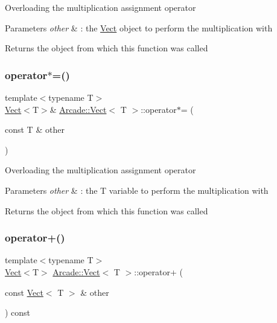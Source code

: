 Overloading the multiplication assignment operator 
\begin{DoxyParams}{Parameters}
{\em other} & \+: the \hyperlink{class_arcade_1_1_vect}{Vect} object to perform the multiplication with \\
\hline
\end{DoxyParams}
\begin{DoxyReturn}{Returns}
the object from which this function was called 
\end{DoxyReturn}
\mbox{\label{class_arcade_1_1_vect_a64363c0a5ff75713a11174f48de1a8ea}} 
\subsubsection{\texorpdfstring{operator$\ast$=()}{operator*=()}\hspace{0.1cm}{\footnotesize\ttfamily [2/2]}}
{\footnotesize\ttfamily template$<$typename T$>$ \\
\hyperlink{class_arcade_1_1_vect}{Vect}$<$T$>$\& \hyperlink{class_arcade_1_1_vect}{Arcade\+::\+Vect}$<$ T $>$\+::operator$\ast$= (\begin{DoxyParamCaption}\item[{const T \&}]{other }\end{DoxyParamCaption})\hspace{0.3cm}{\ttfamily [inline]}}

Overloading the multiplication assignment operator 
\begin{DoxyParams}{Parameters}
{\em other} & \+: the T variable to perform the multiplication with \\
\hline
\end{DoxyParams}
\begin{DoxyReturn}{Returns}
the object from which this function was called 
\end{DoxyReturn}
\mbox{\label{class_arcade_1_1_vect_a63deac98e5926a6a11901d4accb2c838}} 
\subsubsection{\texorpdfstring{operator+()}{operator+()}\hspace{0.1cm}{\footnotesize\ttfamily [1/2]}}
{\footnotesize\ttfamily template$<$typename T$>$ \\
\hyperlink{class_arcade_1_1_vect}{Vect}$<$T$>$ \hyperlink{class_arcade_1_1_vect}{Arcade\+::\+Vect}$<$ T $>$\+::operator+ (\begin{DoxyParamCaption}\item[{const \hyperlink{class_arcade_1_1_vect}{Vect}$<$ T $>$ \&}]{other }\end{DoxyParamCaption}) const\hspace{0.3cm}{\ttfamily [inline]}}

